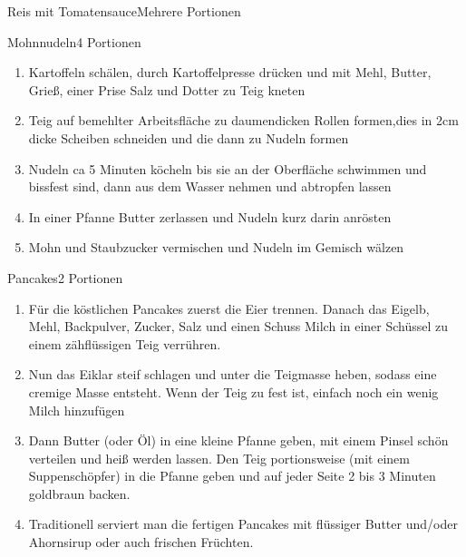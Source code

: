 \documentclass{article}
\begin{document}
\begin{recipe}{Reis mit Tomatensauce}{Mehrere Portionen}

\end{recipe}
\begin{recipe}{Mohnnudeln}{4 Portionen}{}


\begin{enumerate}
\item Kartoffeln schälen, durch Kartoffelpresse drücken und mit Mehl, Butter, Grieß, einer Prise Salz und Dotter zu Teig kneten
\item Teig auf bemehlter Arbeitsfläche zu daumendicken Rollen formen,dies in 2cm dicke Scheiben schneiden und die dann zu Nudeln formen
\item Nudeln ca 5 Minuten köcheln bis sie an der Oberfläche schwimmen und bissfest sind, dann aus dem Wasser nehmen und abtropfen lassen
\item In einer Pfanne Butter zerlassen und Nudeln kurz darin anrösten
\item Mohn und Staubzucker vermischen und Nudeln im Gemisch wälzen 
\end{enumerate}
\end{recipe}

\begin{recipe}{Pancakes}{2 Portionen}{}


\begin{enumerate}
\item Für die köstlichen Pancakes zuerst die Eier trennen. Danach das Eigelb, Mehl, Backpulver, Zucker, Salz und einen Schuss Milch in einer Schüssel zu einem zähflüssigen Teig verrühren.
\item Nun das Eiklar steif schlagen und unter die Teigmasse heben, sodass eine cremige Masse entsteht. Wenn der Teig zu fest ist, einfach noch ein wenig Milch hinzufügen
\item Dann Butter (oder Öl) in eine kleine Pfanne geben, mit einem Pinsel schön verteilen und heiß werden lassen. Den Teig portionsweise (mit einem Suppenschöpfer) in die Pfanne geben und auf jeder Seite 2 bis 3 Minuten goldbraun backen.
\item Traditionell serviert man die fertigen Pancakes mit flüssiger Butter und/oder Ahornsirup oder auch frischen Früchten.
\end{enumerate}
\end{recipe}
\end{document}
